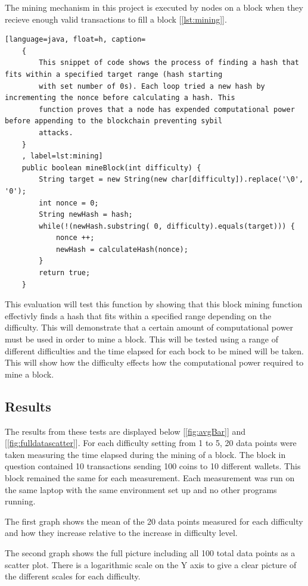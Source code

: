 \documentclass{l4proj}
\begin{document}
The mining mechanism in this project is executed by nodes on a block when they recieve enough valid transactions to
fill a block [\ref{lst:mining}].

\begin{lstlisting}[language=java, float=h, caption=
    {
        This snippet of code shows the process of finding a hash that fits within a specified target range (hash starting
        with set number of 0s). Each loop tried a new hash by incrementing the nonce before calculating a hash. This 
        function proves that a node has expended computational power before appending to the blockchain preventing sybil
        attacks.
    }
    , label=lst:mining]
    public boolean mineBlock(int difficulty) {
        String target = new String(new char[difficulty]).replace('\0', '0');
        int nonce = 0; 
        String newHash = hash;
		while(!(newHash.substring( 0, difficulty).equals(target))) {
            nonce ++;
			newHash = calculateHash(nonce);
        }
        return true;
    }
\end{lstlisting}

This evaluation will test this function by showing that this block mining function effectivly finds a hash that fits 
within a specified range depending on the difficulty. This will demonstrate that a certain amount of computational
power must be used in order to mine a block. This will be tested using a range of different difficulties and the time
elapsed for each bock to be mined will be taken. This will show how the difficulty effects how the computational power 
required to mine a block.



\subsection{Results}
The results from these tests are displayed below [\ref{fig:avgBar}] and [\ref{fig:fulldatascatter}]. For each 
difficulty setting from 1 to 5, 20 data points were taken measuring the time elapsed during the mining of
a block. The block in question contained 10 transactions sending 100 coins to 10 different wallets. This block
remained the same for each measurement. Each measurement was run on the same laptop with the same environment
set up and no other programs running.

The first graph shows the mean of the 20 data points measured for each difficulty and how they increase relative
to the increase in difficulty level.

The second graph shows the full picture including all 100 total data points as a scatter plot. There is a logarithmic
scale on the Y axis to give a clear picture of the different scales for each difficulty.
\end{document}

